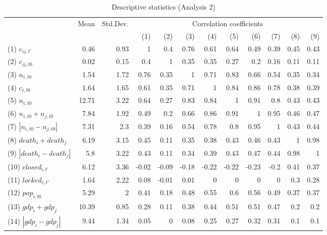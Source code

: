 \begin{landscape}
\begin{table}[ht]
	\begin{threeparttable}
\caption{Descriptive statistics (Analysis 2)}
\label{tab:DescriptivesAnalysis2}
\begin{small}
\centering
\begin{tabular}{lrrrrrrrrrrr}
\hline\noalign{\smallskip}
    & Mean & Std.Dev. & \multicolumn{9}{c}{Correlation coefficients}  \\ 
\noalign{\smallskip}\hline\noalign{\smallskip}
		&		&		&	(1)	&	(2)	&	(3)	&	(4)	&	(5)	&	(6)	&	(7)	&	(8)	&	(9)	\\
\noalign{\smallskip}\hline\noalign{\smallskip}
(1)	$c_{ij,t'}$	&	0.46	&	0.93	&	1	&	0.4	&	0.76	&	0.61	&	0.64	&	0.49	&	0.39	&	0.45	&	0.43	\\
(2)	$c_{ij,t0}$	&	0.02	&	0.15	&	0.4	&	1	&	0.35	&	0.35	&	0.27	&	0.2	&	0.16	&	0.11	&	0.11	\\
(3)	$n_{i,t0}$	&	1.54	&	1.72	&	0.76	&	0.35	&	1	&	0.71	&	0.83	&	0.66	&	0.54	&	0.35	&	0.34	\\
(4)	$c_{i,t0}$	&	1.64	&	1.65	&	0.61	&	0.35	&	0.71	&	1	&	0.84	&	0.86	&	0.78	&	0.38	&	0.39	\\
(5)	$n_{i,t0}$	&	12.71	&	3.22	&	0.64	&	0.27	&	0.83	&	0.84	&	1	&	0.91	&	0.8	&	0.43	&	0.43	\\
(6)	$n_{i,t0}+n_{j,t0}$	&	7.84	&	1.92	&	0.49	&	0.2	&	0.66	&	0.86	&	0.91	&	1	&	0.95	&	0.46	&	0.47	\\
(7)	$|n_{i,t0}-n_{j,t0}|$	&	7.31	&	2.3	&	0.39	&	0.16	&	0.54	&	0.78	&	0.8	&	0.95	&	1	&	0.43	&	0.44	\\
(8)	$death_i+death_j$	&	6.19	&	3.15	&	0.45	&	0.11	&	0.35	&	0.38	&	0.43	&	0.46	&	0.43	&	1	&	0.98	\\
(9)	$|death_i-death_j|$	&	5.8	&	3.22	&	0.43	&	0.11	&	0.34	&	0.39	&	0.43	&	0.47	&	0.44	&	0.98	&	1	\\
(10)	$closed_{i,t'}$	&	6.12	&	3.36	&	-0.02	&	-0.09	&	-0.18	&	-0.22	&	-0.22	&	-0.23	&	-0.2	&	0.41	&	0.37	\\
(11)	$locked_{i,t'}$	&	1.64	&	2.22	&	0.08	&	-0.01	&	0.01	&	0	&	0	&	0	&	0	&	0.3	&	0.28	\\
(12)	$pop_{i,t0}$	&	5.29	&	2	&	0.41	&	0.18	&	0.48	&	0.55	&	0.6	&	0.56	&	0.49	&	0.37	&	0.37	\\
(13)	$gdp_i+gdp_j$	&	10.39	&	0.85	&	0.28	&	0.11	&	0.38	&	0.44	&	0.51	&	0.51	&	0.47	&	0.2	&	0.2	\\
(14)	$|gdp_i-gdp_j|$	&	9.44	&	1.34	&	0.05	&	0	&	0.08	&	0.25	&	0.27	&	0.32	&	0.31	&	0.1	&	0.1	\\

\end{tabular}
\end{small}
\end{threeparttable}
\end{table}
\end{landscape}
